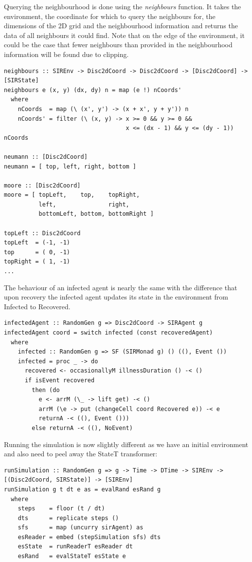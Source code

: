 Querying the neighbourhood is done using the \textit{neighbours} function. It takes the environment, the coordinate for which to query the neighbours for, the dimensions of the 2D grid and the neighbourhood information and returns the data of all neighbours it could find. Note that on the edge of the environment, it could be the case that fewer neighbours than provided in the neighbourhood information will be found due to clipping.

\begin{verbatim}
neighbours :: SIREnv -> Disc2dCoord -> Disc2dCoord -> [Disc2dCoord] -> [SIRState]
neighbours e (x, y) (dx, dy) n = map (e !) nCoords'
  where
    nCoords  = map (\ (x', y') -> (x + x', y + y')) n
    nCoords' = filter (\ (x, y) -> x >= 0 && y >= 0 && 
                                   x <= (dx - 1) && y <= (dy - 1)) nCoords
                           
neumann :: [Disc2dCoord]
neumann = [ top, left, right, bottom ]

moore :: [Disc2dCoord]
moore = [ topLeft,    top,    topRight,
          left,               right,
          bottomLeft, bottom, bottomRight ]

topLeft :: Disc2dCoord
topLeft  = (-1, -1)
top      = ( 0, -1)
topRight = ( 1, -1)
...
\end{verbatim}

The behaviour of an infected agent is nearly the same with the difference that upon recovery the infected agent updates its state in the environment from Infected to Recovered.

\begin{verbatim}
infectedAgent :: RandomGen g => Disc2dCoord -> SIRAgent g
infectedAgent coord = switch infected (const recoveredAgent)
  where
    infected :: RandomGen g => SF (SIRMonad g) () ((), Event ())
    infected = proc _ -> do
      recovered <- occasionallyM illnessDuration () -< ()
      if isEvent recovered
        then (do
          e <- arrM (\_ -> lift get) -< ()
          arrM (\e -> put (changeCell coord Recovered e)) -< e
          returnA -< ((), Event ()))
        else returnA -< ((), NoEvent)
\end{verbatim}

Running the simulation is now slightly different as we have an initial environment and also need to peel away the StateT transformer:
\begin{verbatim}
runSimulation :: RandomGen g => g -> Time -> DTime -> SIREnv -> [(Disc2dCoord, SIRState)] -> [SIREnv]
runSimulation g t dt e as = evalRand esRand g
  where
    steps    = floor (t / dt)
    dts      = replicate steps ()
    sfs      = map (uncurry sirAgent) as
    esReader = embed (stepSimulation sfs) dts
    esState  = runReaderT esReader dt
    esRand   = evalStateT esState e
\end{verbatim}

